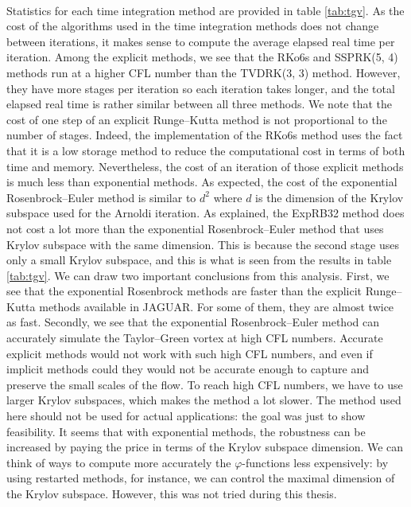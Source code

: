       \paragraph{}
      Statistics for each time integration method are provided in table \ref{tab:tgv}.
      As the cost of the algorithms used in the time integration methods does not change between iterations, it makes sense to compute the average elapsed real time per iteration.
      Among the explicit methods, we see that the RKo6s and SSPRK(5, 4) methods run at a higher CFL number than the TVDRK(3, 3) method.
      However, they have more stages per iteration so each iteration takes longer, and the total elapsed real time is rather similar between all three methods.
      We note that the cost of one step of an explicit Runge--Kutta method is not proportional to the number of stages.
      Indeed, the implementation of the RKo6s method uses the fact that it is a low storage method to reduce the computational cost in terms of both time and memory.
      Nevertheless, the cost of an iteration of those explicit methods is much less than exponential methods.
      As expected, the cost of the exponential Rosenbrock--Euler method is similar to $d^2$ where $d$ is the dimension of the Krylov subspace used for the Arnoldi iteration.
      As explained, the ExpRB32 method does not cost a lot more than the exponential Rosenbrock--Euler method that uses Krylov subspace with the same dimension.
      This is because the second stage uses only a small Krylov subspace, and this is what is seen from the results in table \ref{tab:tgv}.
      We can draw two important conclusions from this analysis.
      First, we see that the exponential Rosenbrock methods are faster than the explicit Runge--Kutta methods available in JAGUAR.
      For some of them, they are almost twice as fast.
      Secondly, we see that the exponential Rosenbrock--Euler method can accurately simulate the Taylor--Green vortex at high CFL numbers.
      Accurate explicit methods would not work with such high CFL numbers, and even if implicit methods could they would not be accurate enough to capture and preserve the small scales of the flow.
      To reach high CFL numbers, we have to use larger Krylov subspaces, which makes the method a lot slower.
      The method used here should not be used for actual applications: the goal was just to show feasibility.
      It seems that with exponential methods, the robustness can be increased by paying the price in terms of the Krylov subspace dimension.
      We can think of ways to compute more accurately the $\varphi$-functions less expensively: by using restarted methods, for instance, we can control the maximal dimension of the Krylov subspace.
      However, this was not tried during this thesis.

